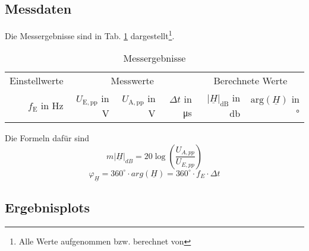 %
\subsection{Messdaten}
\label{subsec:4_Daten}
%
Die Messergebnisse sind in Tab. \ref{tab:4_Messdaten} dargestellt\footnote{Alle Werte aufgenommen bzw. berechnet von \autorA}.
%
\begin{table}[H]
  \small
  \centering
	\caption{Messergebnisse}
	\label{tab:4_Messdaten}
	\begin{tabular}{rrrrrr}
	  \toprule
	  \multicolumn{1}{c}{Einstellwerte} &
		\multicolumn{3}{c}{Messwerte} &
		\multicolumn{2}{c}{Berechnete Werte} \\
		\cmidrule(lr{1mm}){1-1}\cmidrule(lr{1mm}){2-4}\cmidrule(lr{1mm}){5-6}
		$f_\mathrm{E}$ in \si{\hertz} &
			$U_\mathrm{E,pp}$ in \si{\volt} &
    		$U_\mathrm{A,pp}$ in \si{\volt} &
    		$\Delta t$ in \si{\micro\second} &
    			$|\underline{H}|_\mathrm{dB}$ in \si{\decibel} &
				$\mathrm{arg}(\underline{H})$ in \si{\degree}\\
		\midrule
    
		\bottomrule
	\end{tabular}
\end{table}
%
Die Formeln dafür sind
\[m|\underline{H}|_{dB}=20\log(\frac{U_{A,pp}}{U_{E,pp}})\]
\[{\varphi}_{\underline H}=360^\circ \cdot arg(\underline{H})=360^\circ \cdot f_E \cdot \Delta t \]
%
%
\newpage
\subsection{Ergebnisplots}
\label{subsec:4_Plots}
%
%

%
%
%
%
%
%
%
